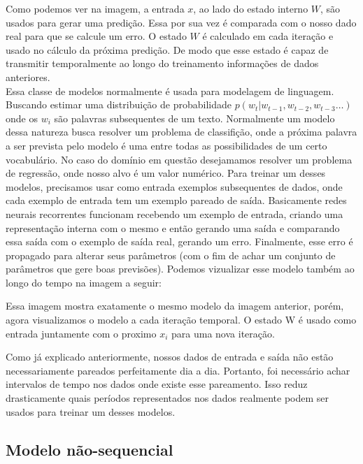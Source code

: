 Como podemos ver na imagem, a entrada $x$, ao lado do estado interno $W$, são usados para gerar uma predição. Essa por sua vez é comparada com o nosso dado real para que se calcule um erro. O estado $W$ é calculado em cada iteração e usado no cálculo da próxima predição. De modo que esse estado é capaz de transmitir temporalmente ao longo do treinamento informações de dados anteriores.
\\

Essa classe de modelos normalmente é usada para modelagem de linguagem. Buscando estimar uma distribuição de probabilidade $p(w_t | w_{t-1},w_{t-2},w_{t-3} \dots ) $ onde os $w_i$ são palavras subsequentes de um texto. Normalmente um modelo dessa natureza busca resolver um problema de classifição, onde a próxima palavra a ser prevista pelo modelo é uma entre todas as possibilidades de um certo vocabulário. No caso do domínio em questão desejamamos resolver um problema de regressão, onde nosso alvo é um valor numérico. Para treinar um desses modelos, precisamos usar como entrada exemplos subsequentes de dados, onde cada exemplo de entrada tem um exemplo pareado de saída. Basicamente redes neurais recorrentes funcionam recebendo um exemplo de entrada, criando uma representação interna com o mesmo e então gerando uma saída e comparando essa saída com o exemplo de saída real, gerando um erro. Finalmente, esse erro é propagado para alterar seus parâmetros (com o fim de achar um conjunto de parâmetros que gere boas previsões). Podemos vizualizar esse modelo também ao longo do tempo na imagem a seguir:


% 


Essa imagem mostra exatamente o mesmo modelo da imagem anterior, porém, agora visualizamos o modelo a cada iteração temporal. O estado W é usado como entrada juntamente com o proximo $x_i$ para uma nova iteração.

\bigskip

Como já explicado anteriormente, nossos dados de entrada e saída não estão necessariamente pareados perfeitamente dia a dia. Portanto, foi necessário achar intervalos de tempo nos dados onde existe esse pareamento. Isso reduz drasticamente quais períodos representados nos dados realmente podem ser usados para treinar um desses modelos.



\subsection{Modelo não-sequencial}



